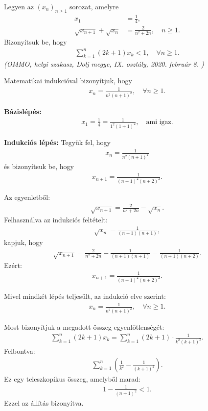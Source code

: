 \begin{problem}
Legyen az $(x_{n})_{n\geq1}$ sorozat, amelyre 
\begin{align*}
x_{1} & =\frac{1}{4},\\
\sqrt{x_{n+1}}+\sqrt{x_{n}} & =\frac{2}{n^{2}+2n},\quad n\geq1.
\end{align*}
Bizonyítsuk be, hogy 
\begin{align*}
\sum_{k=1}^{n}(2k+1)x_{k}<1,\quad\forall n\geq1.
\end{align*}
\emph{(OMMO, helyi szakasz, Dolj megye, IX. osztály, 2020. február 8. )}
\end{problem}

\begin{solution}
Matematikai indukcióval bizonyítjuk, hogy 
\begin{align*}
x_{n}=\frac{1}{n^{2}(n+1)^{2}},\quad\forall n\geq1.
\end{align*}

\textbf{Bázislépés:} 
\begin{align*}
x_{1}=\frac{1}{4}=\frac{1}{1^{2}(1+1)^{2}},\quad\text{ami igaz.}
\end{align*}

\textbf{Indukciós lépés:} Tegyük fel, hogy 
\begin{align*}
x_{n}=\frac{1}{n^{2}(n+1)^{2}}
\end{align*}
és bizonyítsuk be, hogy 
\begin{align*}
x_{n+1}=\frac{1}{(n+1)^{2}(n+2)^{2}}.
\end{align*}

Az egyenletből: 
\begin{align*}
\sqrt{x_{n+1}}=\frac{2}{n^{2}+2n}-\sqrt{x_{n}}.
\end{align*}
Felhasználva az indukciós feltételt: 
\begin{align*}
\sqrt{x_{n}}=\frac{1}{(n+1)(n+1)},
\end{align*}
kapjuk, hogy 
\begin{align*}
\sqrt{x_{n+1}}=\frac{2}{n^{2}+2n}-\frac{1}{(n+1)(n+1)}=\frac{1}{(n+1)(n+2)}.
\end{align*}
Ezért: 
\begin{align*}
x_{n+1}=\frac{1}{(n+1)^{2}(n+2)^{2}}.
\end{align*}

Mivel mindkét lépés teljesült, az indukció elve szerint: 
\begin{align*}
x_{n}=\frac{1}{n^{2}(n+1)^{2}},\quad\forall n\geq1.
\end{align*}

Most bizonyítjuk a megadott összeg egyenlőtlenségét: 
\begin{align*}
\sum_{k=1}^{n}(2k+1)x_{k}=\sum_{k=1}^{n}(2k+1)\cdot\frac{1}{k^{2}(k+1)^{2}}.
\end{align*}
Felbontva: 
\begin{align*}
\sum_{k=1}^{n}\left(\frac{1}{k^{2}}-\frac{1}{(k+1)^{2}}\right).
\end{align*}
Ez egy teleszkopikus összeg, amelyből marad: 
\begin{align*}
1-\frac{1}{(n+1)^{2}}<1.
\end{align*}
Ezzel az állítás bizonyítva. 
\end{solution}

